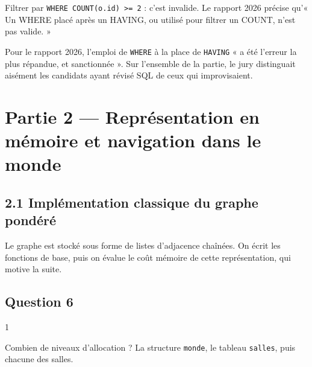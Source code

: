 \documentclass[11pt,a4paper]{article}
\begin{document}
\begin{piege}

Filtrer par \texttt{WHERE\ COUNT(\allowbreak{}o.id)\allowbreak{}\ \textgreater{}=\allowbreak{}\ 2} : c'est invalide. Le rapport 2026 précise qu'« Un WHERE placé après un HAVING, ou utilisé pour filtrer un COUNT, n'est pas valide. »

\end{piege}

\begin{jury}

Pour le rapport 2026, l'emploi de \texttt{WHERE} à la place de \texttt{HAVING} « a été l'erreur la plus répandue, et sanctionnée ». Sur l'ensemble de la partie, le jury distinguait aisément les candidats ayant révisé SQL de ceux qui improvisaient.

\end{jury}

\hypertarget{partie-2-repruxe9sentation-en-muxe9moire-et-navigation-dans-le-monde}{%
\section{Partie 2 --- Représentation en mémoire et navigation dans le monde}\label{partie-2-repruxe9sentation-en-muxe9moire-et-navigation-dans-le-monde}}

\hypertarget{impluxe9mentation-classique-du-graphe-ponduxe9ruxe9}{%
\subsection{2.1 Implémentation classique du graphe pondéré}\label{impluxe9mentation-classique-du-graphe-ponduxe9ruxe9}}

Le graphe est stocké sous forme de listes d'adjacence chaînées. On écrit les fonctions de base, puis on évalue le coût mémoire de cette représentation, qui motive la suite.

\hypertarget{question-6}{%
\subsection{Question 6}\label{question-6}}

\begin{indication}{1}

Combien de niveaux d'allocation ? La structure \texttt{monde}, le tableau \texttt{salles}, puis chacune des salles.

\end{indication}
\end{document}
